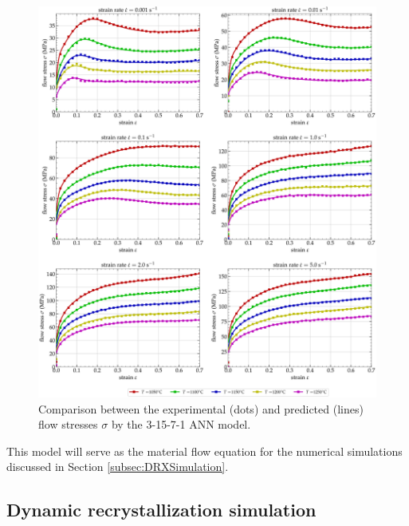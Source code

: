 \documentclass[metals,article,submit,pdftex,moreauthors]{Definitions/mdpi}
\begin{document}
\begin{figure}[H]
\centering
\includegraphics[width=0.9\columnwidth]{Figures/CompExpANN-3-15-7-1}
\caption{Comparison between the experimental (dots) and predicted (lines) flow stresses $\sigma$ by the 3-15-7-1 ANN model.}
\label{fig:ANN-3-15-7-1}
\end{figure}
This model will serve as the material flow equation for the numerical simulations discussed in Section \ref{subsec:DRXSimulation}.

\subsection{Dynamic recrystallization simulation\label{subsec:DRXSimulation}}
\end{document}
